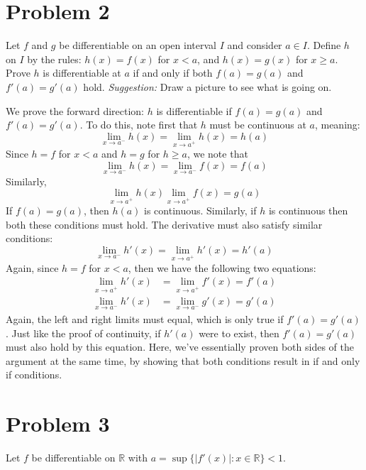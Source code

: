\documentclass[10pt]{article}
\begin{document}
	\pagebreak

	\section*{Problem 2}

	Let $f$ and $g$ be differentiable on an open interval $I$ and consider $a \in I$. Define $h$ on $I$ by 
	the rules: $h(x) = f(x)$ for $x <a$, and $h(x) = g(x)$ for $x \ge a$. Prove $h$ is differentiable at $a$
	if and only if both $f(a) = g(a)$ and $f'(a) = g'(a)$ hold. \textit{Suggestion:} Draw a picture to see 
	what is going on.

	\begin{solution}
		We prove the forward direction: $h$ is differentiable if $f(a) = g(a)$ and $f'(a) = g'(a)$. To do this, 
		note first that $h$ must be continuous at $a$, meaning: 
		\[
			\lim_{x \to a^-} h(x) = \lim_{x \to a^+} h(x) = h(a)
		\] 
		Since $h = f$ for $x < a$ and $h = g$ for $h \ge a$, we note that
		\[
			\lim_{x \to a^-} h(x) = \lim_{x \to a^-} f(x) = f(a)
		\] 
		Similarly, 
		\[
			\lim_{x \to a^+} h(x)  \lim_{x \to a^+} f(x) = g(a)
		\]
		If $f(a) = g(a)$, then $h(a)$ is continuous. Similarly, if $h$ is continuous then both these
		conditions must hold.  The derivative must also satisfy similar conditions:
		\[
			\lim_{x \to a^-} h'(x) = \lim_{x \to a^+} h'(x) = h'(a)
		\] 
		Again, since $h = f$ for $x < a$, then we have the following two equations:
		\begin{align*}
			\lim_{x\to a^+} h'(x) &= \lim_{x \to a^+} f'(x) = f'(a)\\
			\lim_{x \to a^-} h'(x) &= \lim_{x \to a^-} g'(x) = g'(a)
		\end{align*}
		Again, the left and right limits must equal, which is only true if $f'(a) = g'(a)$. Just like the proof
		of continuity, if $h'(a)$ were to exist, then $f'(a) = g'(a)$ must also hold by this equation. Here, 
		we've essentially proven both sides of the argument at the same time, by showing that both conditions
		result in if and only if conditions. 
	\end{solution}

	\pagebreak

	\section*{Problem 3}
	Let $f$ be differentiable on $\mathbb R$ with $a = \sup \{|f'(x)|: x \in \mathbb R\} < 1$. 
\end{document}
